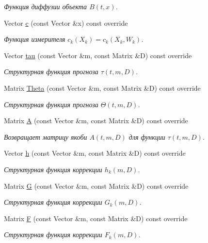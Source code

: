 \begin{DoxyCompactItemize}
\begin{DoxyCompactList}\small\item\em Функция диффузии объекта $B(t,x)$. \end{DoxyCompactList}\item 
Vector \hyperlink{class_tasks_1_1_continuous_discrete_1_1_van_der_pol_linear_af2602ff749602f29f5169ea0e1b391ed}{c} (const Vector \&x) const override
\begin{DoxyCompactList}\small\item\em Функция измерителя $c_k(X_k) = c_k(X_k, W_k)$. \end{DoxyCompactList}\item 
Vector \hyperlink{class_tasks_1_1_continuous_discrete_1_1_van_der_pol_linear_a5b9245d9f403e615a971f2e8009926e6}{tau} (const Vector \&m, const Matrix \&D) const override
\begin{DoxyCompactList}\small\item\em Структурная функция прогноза $\tau(t, m, D)$. \end{DoxyCompactList}\item 
Matrix \hyperlink{class_tasks_1_1_continuous_discrete_1_1_van_der_pol_linear_a6d2f1c4c12551eda7eb97322335960ef}{Theta} (const Vector \&m, const Matrix \&D) const override
\begin{DoxyCompactList}\small\item\em Структурная функция прогноза $\Theta(t,m,D)$. \end{DoxyCompactList}\item 
Matrix \hyperlink{class_tasks_1_1_continuous_discrete_1_1_van_der_pol_linear_abc0ead5ddd90702a5bbb93b07c74df85}{A} (const Vector \&m, const Matrix \&D) const override
\begin{DoxyCompactList}\small\item\em Возвращает матрицу якоби $A(t, m, D)$ для функции $\tau(t, m, D)$. \end{DoxyCompactList}\item 
Vector \hyperlink{class_tasks_1_1_continuous_discrete_1_1_van_der_pol_linear_a2a3ca4ebc2e8c458fbea40e854f375ec}{h} (const Vector \&m, const Matrix \&D) const override
\begin{DoxyCompactList}\small\item\em Структурная функция коррекции $h_k(m, D)$. \end{DoxyCompactList}\item 
Matrix \hyperlink{class_tasks_1_1_continuous_discrete_1_1_van_der_pol_linear_aad1f3c80a043157b90ba0b55ba2390b1}{G} (const Vector \&m, const Matrix \&D) const override
\begin{DoxyCompactList}\small\item\em Структурная функция коррекции $G_k(m, D)$. \end{DoxyCompactList}\item 
Matrix \hyperlink{class_tasks_1_1_continuous_discrete_1_1_van_der_pol_linear_ac624f91abb5e440d9b05835ca281f53f}{F} (const Vector \&m, const Matrix \&D) const override
\begin{DoxyCompactList}\small\item\em Структурная функция коррекции $F_k(m, D)$. \end{DoxyCompactList}\end{DoxyCompactItemize}
